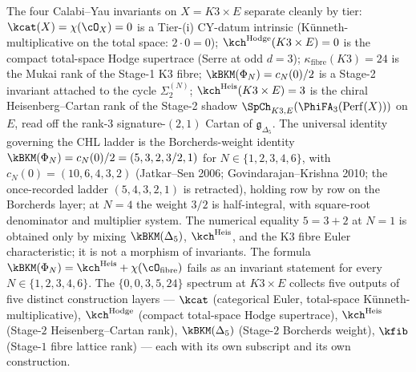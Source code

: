 \begin{remark}
\label{rem:four-kappa-stage-assignment}
The four Calabi--Yau invariants on $X = K3 \times E$ separate cleanly by tier:
$\kcat(X) = \chi(\cO_X) = 0$ is a Tier-(i) CY-datum intrinsic (K\"unneth-multiplicative on the total space: $2\cdot 0 = 0$);
$\kch^{\mathrm{Hodge}}(K3 \times E) = 0$ is the compact total-space
Hodge supertrace (Serre at odd $d = 3$);
$\kappa_{\mathrm{fibre}}(K3) = 24$ is the Mukai rank of the Stage-1 K3 fibre;
$\kBKM(\Phi_N) = c_N(0)/2$ is a Stage-2 invariant attached to the cycle $\Sigma_2^{(N)}$;
$\kch^{\mathrm{Heis}}(K3 \times E) = 3$ is the chiral Heisenberg--Cartan rank of the Stage-2 shadow $\SpCh_{K3, E}(\PhiFA_3(\mathrm{Perf}(X)))$ on $E$, read off the rank-$3$ signature-$(2,1)$ Cartan of $\mathfrak{g}_{\Delta_5}$. The universal identity governing the CHL ladder is the Borcherds-weight identity $\kBKM(\Phi_N) = c_N(0)/2 = (5, 3, 2, 3/2, 1)$ for $N \in \{1, 2, 3, 4, 6\}$, with $c_N(0) = (10, 6, 4, 3, 2)$ (Jatkar--Sen 2006; Govindarajan--Krishna 2010; the once-recorded ladder $(5, 4, 3, 2, 1)$ is retracted), holding row by row on the Borcherds layer; at $N = 4$ the weight $3/2$ is half-integral, with square-root denominator and multiplier system. The numerical equality \(5=3+2\) at \(N=1\) is obtained only by mixing \(\kBKM(\Delta_5)\), \(\kch^{\mathrm{Heis}}\), and the K3 fibre Euler characteristic; it is not a morphism of invariants. The formula $\kBKM(\Phi_N)=\kch^{\mathrm{Heis}}+\chi(\cO_{\mathrm{fibre}})$ fails as an invariant statement for every \(N\in\{1,2,3,4,6\}\). The $\{0, 0, 3, 5, 24\}$ spectrum at $K3 \times E$ collects five outputs of five distinct construction layers — $\kcat$ (categorical Euler, total-space K\"unneth-multiplicative), $\kch^{\mathrm{Hodge}}$ (compact total-space Hodge supertrace), $\kch^{\mathrm{Heis}}$ (Stage-$2$ Heisenberg--Cartan rank), $\kBKM(\Delta_5)$ (Stage-$2$ Borcherds weight), $\kfib$ (Stage-$1$ fibre lattice rank) — each with its own subscript and its own construction.
\end{remark}

